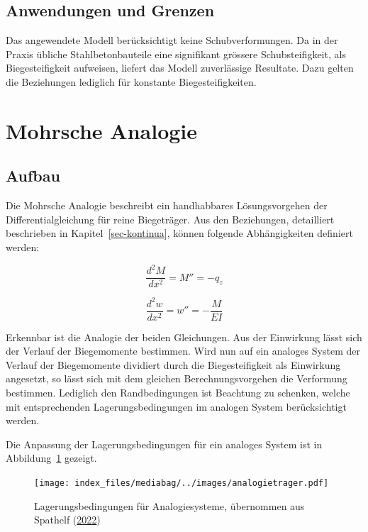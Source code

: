 \documentclass[
  letterpaper,
]{scrreprt}
\begin{document}
\hypertarget{anwendungen-und-grenzen}{%
\subsection{Anwendungen und Grenzen}\label{anwendungen-und-grenzen}}

Das angewendete Modell berücksichtigt keine Schubverformungen. Da in der
Praxis übliche Stahlbetonbauteile eine signifikant grössere
Schubsteifigkeit, als Biegesteifigkeit aufweisen, liefert das Modell
zuverlässige Resultate. Dazu gelten die Beziehungen lediglich für
konstante Biegesteifigkeiten.

\hypertarget{sec-mohrsche_analogie}{%
\section{Mohrsche Analogie}\label{sec-mohrsche_analogie}}

\hypertarget{aufbau-1}{%
\subsection{Aufbau}\label{aufbau-1}}

Die Mohrsche Analogie beschreibt ein handhabbares Lösungsvorgehen der
Differentialgleichung für reine Biegeträger. Aus den Beziehungen,
detailliert beschrieben in Kapitel~\ref{sec-kontinua}, können folgende
Abhängigkeiten definiert werden:

\[
\frac{d^2M}{dx^2} = M'' = -q_z
\]

\[
\frac{d^2w}{dx^2} = w'' = -\frac{M}{EI}
\]

Erkennbar ist die Analogie der beiden Gleichungen. Aus der Einwirkung
lässt sich der Verlauf der Biegemomente bestimmen. Wird nun auf ein
analoges System der Verlauf der Biegemomente dividiert durch die
Biegesteifigkeit als Einwirkung angesetzt, so lässt sich mit dem
gleichen Berechnungsvorgehen die Verformung bestimmen. Lediglich den
Randbedingungen ist Beachtung zu schenken, welche mit entsprechenden
Lagerungsbedingungen im analogen System berücksichtigt werden.

Die Anpassung der Lagerungsbedingungen für ein analoges System ist in
Abbildung~\ref{fig-randbedingungen_analogiesysteme} gezeigt.

\begin{figure}[H]

{\centering \texttt{[image: index\_files/mediabag/../images/analogietrager.pdf]}

}

\caption{\label{fig-randbedingungen_analogiesysteme}Lagerungsbedingungen
für Analogiesysteme, übernommen aus Spathelf
(\protect\hyperlink{ref-Spathelf2022}{2022})}

\end{figure}
\end{document}
